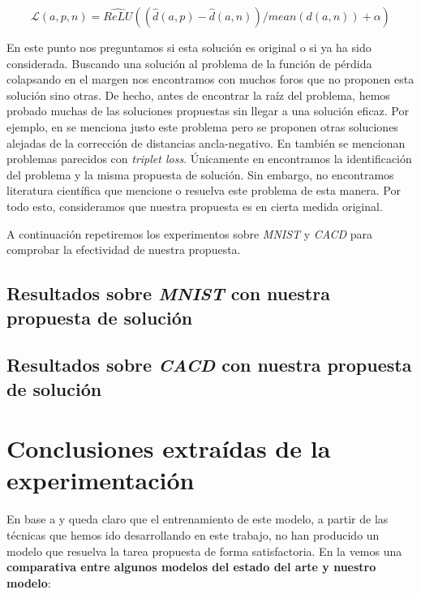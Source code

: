 \begin{equation}
    \mathcal{L}(a, p, n) = \hat{ReLU}((\hat{d}(a, p) - \hat{d}(a, n)) / mean(d(a, n)) + \alpha)
\end{equation}


En este punto nos preguntamos si esta solución es original o si ya ha sido considerada. Buscando una solución al problema de la función de pérdida colapsando en el margen nos encontramos con muchos foros que no proponen esta solución sino otras. De hecho, antes de encontrar la raíz del problema, hemos probado muchas de las soluciones propuestas sin llegar a una solución eficaz. Por ejemplo, en \cite{informatica:respuesta_erronea_problema} se menciona justo este problema pero se proponen otras soluciones alejadas de la corrección de distancias ancla-negativo. En \cite{informatica:github_issue_problema_tripletloss} también se mencionan problemas parecidos con \textit{triplet loss}. Únicamente en \cite{informatica:solucion_triplet_loss} encontramos la identificación del problema y la misma propuesta de solución. Sin embargo, no encontramos literatura científica que mencione o resuelva este problema de esta manera. Por todo esto, consideramos que nuestra propuesta es en cierta medida original.

A continuación repetiremos los experimentos sobre \textit{MNIST} y \textit{CACD} para comprobar la efectividad de nuestra propuesta.

\subsection{Resultados sobre \textit{MNIST} con nuestra propuesta de solución} \label{isubsec:experimentacion_mnist_bien}

\subsection{Resultados sobre \textit{CACD} con nuestra propuesta de solución} \label{isubsec:experimentacion_cacd_bien}

\section{Conclusiones extraídas de la experimentación} \label{isec:conclusiones_experimentacion}

En base a  y  queda claro que el entrenamiento de este modelo, a partir de las técnicas que hemos ido desarrollando en este trabajo, no han producido un modelo que resuelva la tarea propuesta de forma satisfactoria. En la  vemos una \textbf{comparativa entre algunos modelos del estado del arte y nuestro modelo}:

